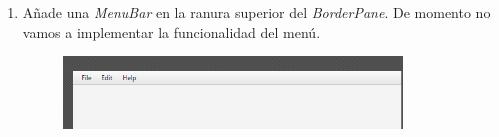\begin{enumerate}
\begin{figure}[H]
	\end{figure}
	\item Añade una \textit{MenuBar} en la ranura superior del \textit{\textit{BorderPane}}. De momento no vamos a implementar la funcionalidad del menú.
	\begin{figure}[H]
		\includegraphics[width=9cm]{img/menuBarTop}
	\end{figure}
	
\end{enumerate}

